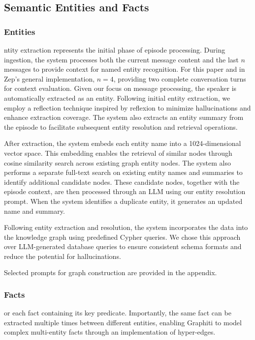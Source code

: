 \documentclass{article}
\begin{document}
\subsection{Semantic Entities and Facts}
\subsubsection{Entities}
ntity extraction represents the initial phase of episode processing. During ingestion, the system processes both the current message content and the last $n$ messages to provide context for named entity recognition. For this paper and in Zep's general implementation, $n=4$, providing two complete conversation turns for context evaluation. Given our focus on message processing, the speaker is automatically extracted as an entity. Following initial entity extraction, we employ a reflection technique inspired by reflexion\cite{reflexion} to minimize hallucinations and enhance extraction coverage. The system also extracts an entity summary from the episode to facilitate subsequent entity resolution and retrieval operations.

After extraction, the system embeds each entity name into a 1024-dimensional vector space. This embedding enables the retrieval of similar nodes through cosine similarity search across existing graph entity nodes. The system also performs a separate full-text search on existing entity names and summaries to identify additional candidate nodes. These candidate nodes, together with the episode context, are then processed through an LLM using our entity resolution prompt. When the system identifies a duplicate entity, it generates an updated name and summary.

Following entity extraction and resolution, the system incorporates the data into the knowledge graph using predefined Cypher queries. We chose this approach over LLM-generated database queries to ensure consistent schema formats and reduce the potential for hallucinations.

Selected prompts for graph construction are provided in the appendix.

\subsubsection{Facts}
or each fact containing its key predicate. Importantly, the same fact can be extracted multiple times between different entities, enabling Graphiti to model complex multi-entity facts through an implementation of hyper-edges.
\end{document}
